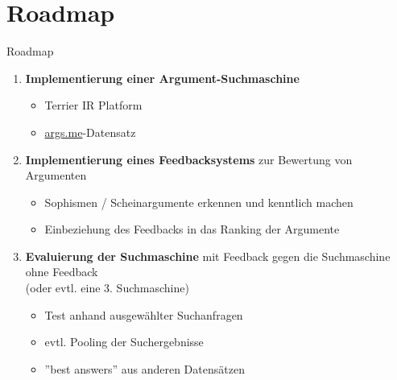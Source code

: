 \documentclass{beamer}
\begin{document}
	\section{Roadmap}
	\begin{frame}{Roadmap}
		\begin{enumerate}
			\item \textbf{Implementierung einer Argument-Suchmaschine}
			\begin{itemize}
				\item Terrier IR Platform
				\item \url{args.me}-Datensatz
			\end{itemize}
			\item \textbf{Implementierung eines Feedbacksystems} zur Bewertung von Argumenten
			\begin{itemize}
				\item Sophismen / Scheinargumente erkennen und kenntlich machen
				\item Einbeziehung des Feedbacks in das Ranking der Argumente
			\end{itemize}
			\item \textbf{Evaluierung der Suchmaschine} mit Feedback gegen die Suchmaschine ohne Feedback\\(oder evtl. eine 3. Suchmaschine)
			\begin{itemize}
				\item Test anhand ausgewählter Suchanfragen
				\item evtl. Pooling der Suchergebnisse
				\item ''best answers'' aus anderen Datensätzen
			\end{itemize}
		\end{enumerate}
	\end{frame}
\end{document}
